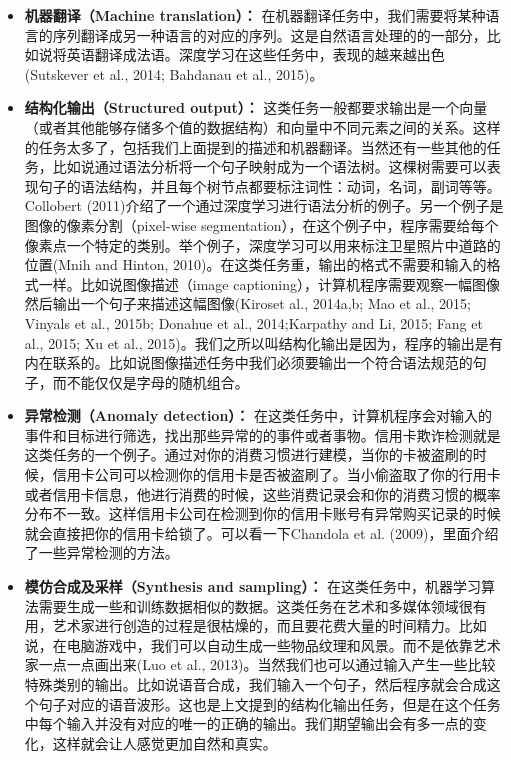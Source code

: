 \begin{itemize}
\item \textbf{机器翻译（Machine translation）：}  在机器翻译任务中，我们需要将某种语言的序列翻译成另一种语言的对应的序列。这是自然语言处理的的一部分，比如说将英语翻译成法语。深度学习在这些任务中，表现的越来越出色(Sutskever et al., 2014; Bahdanau et al., 2015)。
\item \textbf{结构化输出（Structured output）：} 这类任务一般都要求输出是一个向量（或者其他能够存储多个值的数据结构）和向量中不同元素之间的关系。这样的任务太多了，包括我们上面提到的描述和机器翻译。当然还有一些其他的任务，比如说通过语法分析将一个句子映射成为一个语法树。这棵树需要可以表现句子的语法结构，并且每个树节点都要标注词性：动词，名词，副词等等。Collobert (2011)介绍了一个通过深度学习进行语法分析的例子。另一个例子是图像的像素分割（pixel-wise segmentation），在这个例子中，程序需要给每个像素点一个特定的类别。举个例子，深度学习可以用来标注卫星照片中道路的位置(Mnih and Hinton, 2010)。在这类任务重，输出的格式不需要和输入的格式一样。比如说图像描述（image captioning），计算机程序需要观察一幅图像然后输出一个句子来描述这幅图像(Kiroset al., 2014a,b; Mao et al., 2015; Vinyals et al., 2015b; Donahue et al., 2014;Karpathy and Li, 2015; Fang et al., 2015; Xu et al., 2015)。我们之所以叫结构化输出是因为，程序的输出是有内在联系的。比如说图像描述任务中我们必须要输出一个符合语法规范的句子，而不能仅仅是字母的随机组合。

\item \textbf{异常检测（Anomaly detection）：}  在这类任务中，计算机程序会对输入的事件和目标进行筛选，找出那些异常的的事件或者事物。信用卡欺诈检测就是这类任务的一个例子。通过对你的消费习惯进行建模，当你的卡被盗刷的时候，信用卡公司可以检测你的信用卡是否被盗刷了。当小偷盗取了你的行用卡或者信用卡信息，他进行消费的时候，这些消费记录会和你的消费习惯的概率分布不一致。这样信用卡公司在检测到你的信用卡账号有异常购买记录的时候就会直接把你的信用卡给锁了。可以看一下Chandola et al. (2009)，里面介绍了一些异常检测的方法。

\item \textbf{模仿合成及采样（Synthesis and sampling）：}  在这类任务中，机器学习算法需要生成一些和训练数据相似的数据。这类任务在艺术和多媒体领域很有用，艺术家进行创造的过程是很枯燥的，而且要花费大量的时间精力。比如说，在电脑游戏中，我们可以自动生成一些物品纹理和风景。而不是依靠艺术家一点一点画出来(Luo et al., 2013)。当然我们也可以通过输入产生一些比较特殊类别的输出。比如说语音合成，我们输入一个句子，然后程序就会合成这个句子对应的语音波形。这也是上文提到的结构化输出任务，但是在这个任务中每个输入并没有对应的唯一的正确的输出。我们期望输出会有多一点的变化，这样就会让人感觉更加自然和真实。


\end{itemize}
